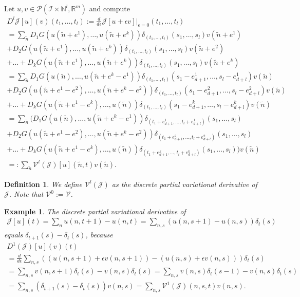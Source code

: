 \documentclass[manuscript]{acmart}
\newcommand{\Rr}{{\mathbb{R}}}
\newcommand{\Nn}{{\mathbb{N}}}
\newcommand{\1}{{\chi}}
\newcommand{\Ii}{{\mathcal{I}}}
\numberwithin{equation}{section}
\theoremstyle{thmlemcorr}
\numberwithin{theorem}{section}
\theoremstyle{thmlemcorr*}
\theoremstyle{defi}
\newtheorem{definition}[theorem]{Definition}
\theoremstyle{remexample}
\newtheorem{example}[theorem]{Example}
\theoremstyle{ass}
\begin{document}
	Let $u,v\in\mathcal{P}(\Ii\times\Nn^l,\Rr^m)$ and compute
	\footnotesize
	\begin{gather*}
		D^l\mathcal{J}[u](v)(t_1,\ldots,t_{l}):=\frac{d}{d\epsilon}\mathcal{J}[u+\epsilon v]\Big|_{\epsilon=0}(t_1,\ldots,t_{l})\\
		=\sum_{\tilde{n}}D_1G(u(\tilde{n}+e^1),\ldots,u(\tilde{n}+e^k))\delta_{(t_1,\ldots,t_{l})}(s_1,\ldots,s_l)v(\tilde{n}+e^1)\\
		+D_2G(u(\tilde{n}+e^1),\ldots,u(\tilde{n}+e^k))\delta_{(t_1,\ldots,t_{l})}(s_1,\ldots,s_l)v(\tilde{n}+e^2)\\+\ldots
		+D_kG(u(\tilde{n}+e^1),\ldots,u(\tilde{n}+e^k))\delta_{(t_1,\ldots,t_{l})}(s_1,\ldots,s_l)v(\tilde{n}+e^k)\\
		=\sum_{\tilde{n}}D_1G(u(\tilde{n}),\ldots,u(\tilde{n}+e^k-e^1))\delta_{(t_1,\ldots,t_{l})}(s_1-e^1_{d+1},\ldots,s_l-e^1_{d+l})v(\tilde{n})\\
		+D_2G(u(\tilde{n}+e^1-e^2),\ldots,u(\tilde{n}+e^k-e^2))\delta_{(t_1,\ldots,t_{l})}(s_1-e^2_{d+1},\ldots,s_l-e^2_{d+l})v(\tilde{n})\\+\ldots
		+D_kG(u(\tilde{n}+e^1-e^k),\ldots,u(\tilde{n}))\delta_{(t_1,\ldots,t_{l})}(s_1-e^k_{d+1},\ldots,s_l-e^k_{d+l})v(\tilde{n})\\
		=\sum_{\tilde{n}}\Big(D_1G(u(\tilde{n}),\ldots,u(\tilde{n}+e^k-e^1))\delta_{(t_1+e^1_{d+1},\ldots,t_{l}+e^1_{d+l})}(s_1,\ldots,s_l)\\
		+D_2G(u(\tilde{n}+e^1-e^2),\ldots,u(\tilde{n}+e^k-e^2))\delta_{(t_1+e^2_{d+1},\ldots,t_{l}+e^2_{d+l})}(s_1,\ldots,s_l)\\+\ldots
		+D_kG(u(\tilde{n}+e^1-e^k),\ldots,u(\tilde{n}))\delta_{(t_1+e^k_{d+1},\ldots,t_{l}+e^k_{d+l})}(s_1,\ldots,s_l)\Big)v(\tilde{n})\\
		=:\sum_{\tilde{n}}\mathcal{V}^l(\mathcal{J})[u](\tilde{n},t)v(\tilde{n}).
	\end{gather*}
	\normalsize
	\begin{definition}
	We define $\mathcal{V}^l(\mathcal{J})$ as the \emph{discrete partial variational derivative} of $\mathcal{J}$.
	Note that $\mathcal{V}^0:=\mathcal{V}$.
\end{definition}
\begin{example}
	\label{dpvd1}
	The discrete partial variational derivative of 
	\begin{gather*}
		\mathcal{J}[u](t)=\sum_nu(n,t+1)-u(n,t)=\sum_{n,s}(u(n,s+1)-u(n,s))\delta_t(s)
	\end{gather*}
	equals $\delta_{t+1}(s)-\delta_t(s)$, because
	\small
	\begin{gather*}
		D^1(\mathcal{J})[u](v)(t)\\
		=\frac{d}{d\epsilon} \sum_{n,s}((u(n,s+1)+\epsilon v(n,s+1))-(u(n,s)+\epsilon v(n,s)))\delta_t(s)\\
		=\sum_{n,s}v(n,s+1)\delta_t(s)-v(n,s)\delta_t(s)=\sum_{n,s}v(n,s)\delta_t(s-1)-v(n,s)\delta_t(s)\\
		=\sum_{n,s}(\delta_{t+1}(s)-\delta_t(s))v(n,s)=\sum_{n,s}\mathcal{V}^1(\mathcal{J})(n,s,t)v(n,s).
	\end{gather*}
	\normalsize
\end{example}
\end{document}
